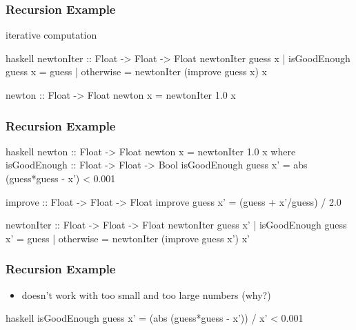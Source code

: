 \documentclass[dvipsnames]{beamer}
\theoremstyle{plain}
\begin{document}
\begin{frame}[fragile]
  \frametitle{Recursion Example}

  \begin{exampleblock}{iterative computation}
    \begin{pygments}{haskell}
newtonIter :: Float -> Float -> Float
newtonIter guess x
  | isGoodEnough guess x = guess
  | otherwise            =
        newtonIter (improve guess x) x

newton :: Float -> Float
newton x = newtonIter 1.0 x
    \end{pygments}
  \end{exampleblock}
\end{frame}

\begin{frame}[fragile]
  \frametitle{Recursion Example}

  \begin{exampleblock}{}
    \begin{pygments}{haskell}
newton :: Float -> Float
newton x = newtonIter 1.0 x
  where
    isGoodEnough :: Float -> Float -> Bool
    isGoodEnough guess x' =
        abs (guess*guess - x') < 0.001

    improve :: Float -> Float -> Float
    improve guess x' = (guess + x'/guess) / 2.0

    newtonIter :: Float -> Float -> Float
    newtonIter guess x'
      | isGoodEnough guess x' = guess
      | otherwise             =
          newtonIter (improve guess x') x'
    \end{pygments}
  \end{exampleblock}
\end{frame}

\begin{frame}[fragile]
  \frametitle{Recursion Example}

  \begin{exampleblock}{}
    \begin{itemize}
      \item doesn't work with too small and too large numbers (why?)
    \end{itemize}

    \pause
    \smallskip
    \begin{pygments}{haskell}
isGoodEnough guess x' =
    (abs (guess*guess - x')) / x' < 0.001
    \end{pygments}
  \end{exampleblock}
\end{frame}
\end{document}
